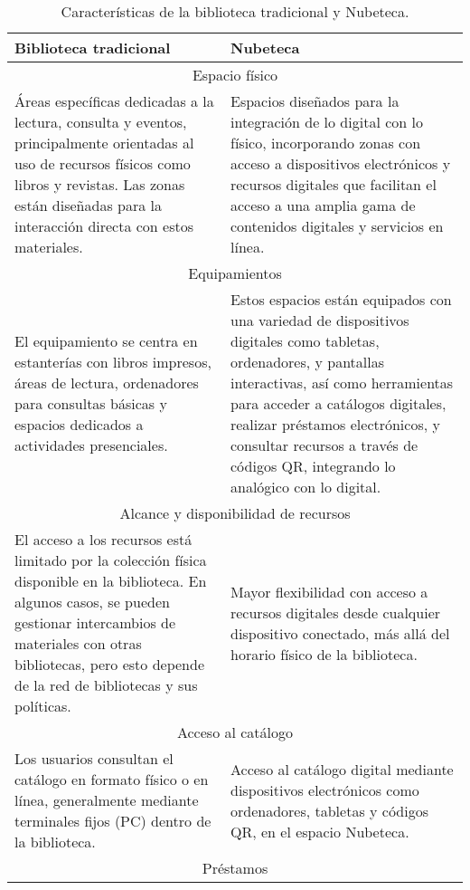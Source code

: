 \documentclass[spanish]{textolivre}
\begin{document}
\begin{table}[htbp]
\footnotesize
\centering
\begin{threeparttable}
\caption{Características de la biblioteca tradicional y Nubeteca.}
\label{tbl1}
\centering
\begin{tabular}{p{} p{}}
\toprule
Biblioteca tradicional & Nubeteca \\ 
\midrule
\multicolumn{2}{c}{Espacio físico} \\
\midrule
Áreas específicas dedicadas a la lectura, consulta y eventos, principalmente orientadas al uso de recursos físicos como libros y revistas. Las zonas están diseñadas para la interacción directa con estos materiales. & Espacios diseñados para la integración de lo digital con lo físico, incorporando zonas con acceso a dispositivos electrónicos y recursos digitales que facilitan el acceso a una amplia gama de contenidos digitales y servicios en línea. \\ 
\midrule
\multicolumn{2}{c}{Equipamientos} \\
\midrule
El equipamiento se centra en estanterías con libros impresos, áreas de lectura, ordenadores para consultas básicas y espacios dedicados a actividades presenciales. & Estos espacios están equipados con una variedad de dispositivos digitales como tabletas, ordenadores, y pantallas interactivas, así como herramientas para acceder a catálogos digitales, realizar préstamos electrónicos, y consultar recursos a través de códigos QR, integrando lo analógico con lo digital. \\
\midrule
\multicolumn{2}{c}{Alcance y disponibilidad de recursos} \\
\midrule
El acceso a los recursos está limitado por la colección física disponible en la biblioteca. En algunos casos, se pueden gestionar intercambios de materiales con otras bibliotecas, pero esto depende de la red de bibliotecas y sus políticas. & Mayor flexibilidad con acceso a recursos digitales desde cualquier dispositivo conectado, más allá del horario físico de la biblioteca. \\
\midrule
\multicolumn{2}{c}{Acceso al catálogo} \\
\midrule
Los usuarios consultan el catálogo en formato físico o en línea, generalmente mediante terminales fijos (PC) dentro de la biblioteca. & Acceso al catálogo digital mediante dispositivos electrónicos como ordenadores, tabletas y códigos QR, en el espacio Nubeteca. \\
\midrule
\multicolumn{2}{c}{Préstamos} \\

\end{tabular}
\end{threeparttable}
\end{table}
\end{document}
